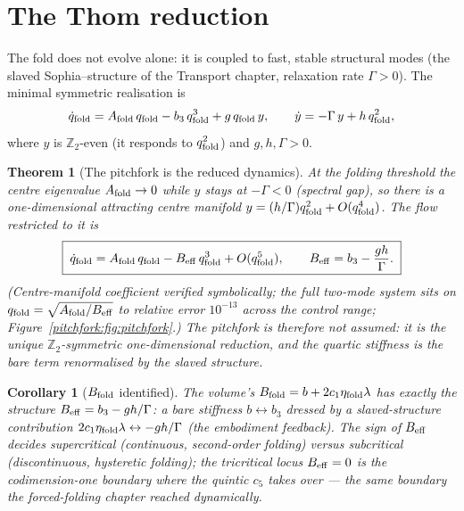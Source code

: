 \documentclass[11pt,a4paper,oneside]{book}
\newcommand{\qf}{q_{\rm fold}}
\newcommand{\Afold}{A_{\rm fold}}
\newcommand{\Bfold}{B_{\rm fold}}
\newcommand{\Beff}{B_{\rm eff}}
\theoremstyle{plain}
\newtheorem{corollary}{Corollary}[chapter]
\newtheorem{theorem}{Theorem}[chapter]
\theoremstyle{definition}
\theoremstyle{remark}
\begin{document}
\section{The Thom reduction}

The fold does not evolve alone: it is coupled to fast, stable structural modes (the slaved
Sophia--structure of the Transport chapter, relaxation rate $\Gamma>0$). The minimal symmetric
realisation is
\begin{equation}
\dot\qf=\Afold\,\qf-b_3\,\qf^{3}+g\,\qf\,y,
\qquad
\dot y=-\Gamma\,y+h\,\qf^{2},
\end{equation}
where $y$ is $\mathbb Z_2$-even (it responds to $\qf^2$) and $g,h,\Gamma>0$.

\begin{theorem}[The pitchfork is the reduced dynamics]\label{pitchfork:thm:pitchfork}
At the folding threshold the centre eigenvalue $\Afold\to0$ while $y$ stays at $-\Gamma<0$ (spectral
gap), so there is a one-dimensional attracting centre manifold $y=(h/\Gamma)\qf^{2}+O(\qf^4)$. The
flow restricted to it is
\begin{equation}
\boxed{\;\dot\qf=\Afold\,\qf-\Beff\,\qf^{3}+O(\qf^5),
\qquad \Beff=b_3-\frac{g h}{\Gamma}.\;}
\end{equation}
(Centre-manifold coefficient verified symbolically; the full two-mode system sits on
$\qf=\sqrt{\Afold/\Beff}$ to relative error $10^{-13}$ across the control range;
Figure~\ref{pitchfork:fig:pitchfork}.) The pitchfork is therefore not assumed: it is the unique
$\mathbb Z_2$-symmetric one-dimensional reduction, and the quartic stiffness is the bare term
renormalised by the slaved structure.
\end{theorem}

\begin{corollary}[$\Bfold$ identified]
The volume's $\Bfold=b+2c_1\eta_{\rm fold}\lambda$ has exactly the structure $\Beff=b_3-gh/\Gamma$:
a bare stiffness $b\leftrightarrow b_3$ dressed by a slaved-structure contribution
$2c_1\eta_{\rm fold}\lambda\leftrightarrow-gh/\Gamma$ (the embodiment feedback). The sign of $\Beff$
decides supercritical (continuous, second-order folding) versus subcritical (discontinuous, hysteretic
folding); the tricritical locus $\Beff=0$ is the codimension-one boundary where the quintic $c_5$ takes
over --- the same boundary the forced-folding chapter reached dynamically.
\end{corollary}

\end{document}
